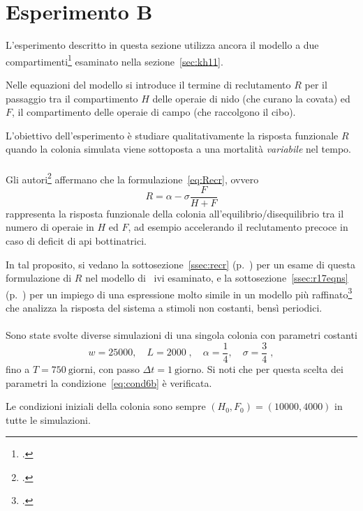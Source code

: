 \section{Esperimento B}
L'esperimento descritto in questa sezione utilizza ancora il modello a due compartimenti\footcite{khoury2011}
esaminato nella sezione~\ref{sec:kh11}.

Nelle equazioni del modello si introduce il termine di reclutamento $R$ per il passaggio tra il compartimento $H$ delle
operaie di nido (che curano la covata) ed $F$, il compartimento delle operaie di campo (che raccolgono il cibo).

L'obiettivo dell'esperimento è studiare qualitativamente la risposta funzionale $R$ quando la colonia simulata viene
sottoposta a una mortalità \emph{variabile} nel tempo.

\paragraph{}
Gli autori\footcite[2,3]{khoury2011} affermano che la formulazione~\eqref{eq:Recr}, ovvero
$$R = \alpha - \sigma \frac{F}{H+F}$$
rappresenta la risposta funzionale della colonia all'equilibrio/disequilibrio tra il numero di operaie in $H$ ed $F$,
ad esempio accelerando il reclutamento precoce in caso di deficit di api bottinatrici.

In tal proposito, si vedano la sottosezione~\ref{ssec:recr} (p.~\pageref{ssec:recr}) per un esame di questa formulazione
di $R$ nel modello di~\citeauthor{khoury2011} ivi esaminato, e la sottosezione~\ref{ssec:r17eqns}
(p.~\pageref{ssec:r17eqns})
per un impiego di una espressione molto simile in un modello più raffinato\footcite{ratti2017} che analizza
la risposta del sistema a stimoli non costanti, bensì periodici.

\paragraph{}
Sono state svolte diverse simulazioni di una singola colonia con parametri costanti
$$w= 25000, \quad L=2000 \; , \quad \alpha=\frac{1}{4}, \quad \sigma= \frac{3}{4} \; ,$$
fino a $T=750~\text{giorni}$, con passo $\Delta t = 1~\text{giorno}$.
Si noti che per questa scelta dei parametri la condizione~\eqref{eq:cond6b} è verificata.

Le condizioni iniziali della colonia sono sempre $(H_0, F_0) = (10000, 4000)$ in tutte le simulazioni.

